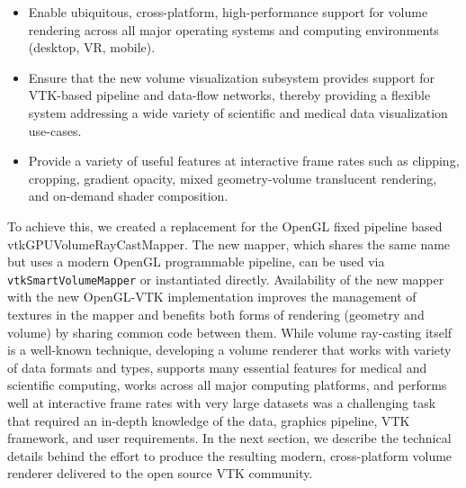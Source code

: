 \begin{itemize}
  \item Enable ubiquitous, cross-platform, high-performance support for volume
    rendering across all major operating systems and computing environments (desktop, VR, mobile).

  \item Ensure that the new volume visualization subsystem provides support for VTK-based pipeline and data-flow
    networks, thereby providing a flexible system addressing a wide variety of scientific and medical data
    visualization use-cases.

  \item Provide a variety of useful features at interactive frame
    rates such as clipping, cropping, gradient opacity, mixed geometry-volume translucent
    rendering, and on-demand shader composition.
\end{itemize}

To achieve this, we created a replacement for the OpenGL fixed pipeline based
vtkGPUVolumeRayCastMapper. The new mapper, which shares the same name but uses
a modern OpenGL programmable pipeline, can be used via
\texttt{vtkSmartVolumeMapper} or instantiated directly. Availability of the
new mapper with the new OpenGL-VTK implementation improves the management of
textures in the mapper and benefits both forms of rendering (geometry and
volume) by sharing common code between them. While volume ray-casting itself
is a well-known technique, developing a volume renderer that works with
variety of data formats and types, supports many essential features for
medical and scientific computing, works across all major computing platforms,
and performs well at interactive frame rates with very large datasets was a
challenging task that required an in-depth knowledge of the data, graphics
pipeline, VTK framework, and user requirements.  In the next section, we
describe the technical details behind the effort to produce the resulting
modern, cross-platform volume renderer delivered to the open source VTK
community.
